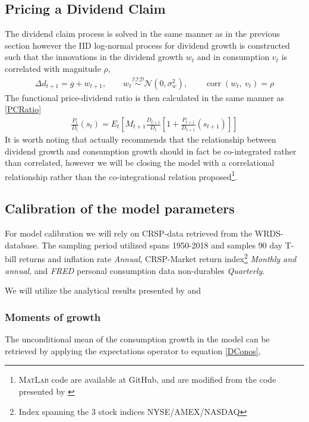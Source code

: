 \subsection{Pricing a Dividend Claim}
The dividend claim process is solved in the same manner as in the previous section however the IID log-normal process for dividend growth is constructed such that the innovations in the dividend growth $w_t$ and in consumption $v_t$ is correlated with magnitude $\rho$,
\begin{align}
    \Delta d_{t+1} = g + w_{t+1},\qquad w_t \overset{\mathcal{IID}}{\sim}\mathcal{N}\left(0,\sigma^2_w \right),\qquad \operatorname{corr}\left( w_t,\ v_t \right) = \rho
\end{align}
The functional price-dividend ratio is then calculated in the same manner as \eqref{PCRatio}
\begin{align}
    \frac{P_{t}}{D_{t}}\left(s_{t}\right)=E_{t}\left[M_{t+1} \frac{D_{t+1}}{D_{t}}\left[1+\frac{P_{t+1}}{D_{t+1}}\left(s_{t+1}\right)\right]\right] \label{pd_ratio}
\end{align}
It is worth noting that \citet{Campbell1999} actually recommends that the relationship between dividend growth and consumption growth should in fact be co-integrated rather than correlated, however we will be closing the model with a correlational relationship rather than the co-integrational relation proposed\footnote{\textsc{MatLab} code are available at GitHub, and are modified from the code presented by \citet{Costa2009}}.

\subsection{Calibration of the model parameters}
For model calibration we will rely on CRSP-data retrieved from the WRDS-database. The sampling period utilized spans 1950-2018 and samples 90 day T-bill returns and inflation rate \textit{Annual}, CRSP-Market return index\footnote{Index spanning the 3 stock indices NYSE/AMEX/NASDAQ} \textit{Monthly and annual}, and \textit{FRED} personal consumption data non-durables \textit{Quarterly}.  


We will utilize the analytical results presented by \citet{Campbell1999} and \citet{StigVinter2010}

\subsubsection{Moments of growth}
The unconditional mean of the consumption growth in the model can be retrieved by applying the expectations operator to equation \eqref{DConos},

